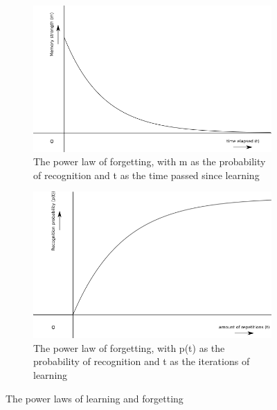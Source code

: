 \begin{figure}
    \centering
    \begin{subfigure}{0.7\textwidth}
        \includegraphics[width=\textwidth]{img/powerlawforgetting}
        \caption{The power law of forgetting, with m as the probability of recognition and t as the time passed since learning}
        \label{fig:powerlawforgetting}
    \end{subfigure}
    \par\bigskip
    \begin{subfigure}{0.7\textwidth}
        \includegraphics[width=\textwidth]{img/powerlawlearning}
        \caption{The power law of forgetting, with p(t) as the probability of recognition and t as the iterations of learning}
        \label{fig:powerlawlearning}
    \end{subfigure}
    \caption{The power laws of learning and forgetting}
\end{figure}

